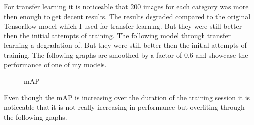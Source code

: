 \newpage \noindent
For transfer learning it is noticeable that 200 images for each category was more then enough to get decent results. The results degraded compared
to the original Tensorflow model which I used for transfer learning. But they were still better then the initial attempts of training. The following
model through transfer learning a degradation of. But they were still better then the initial attempts of training. The following
graphs are smoothed by a factor of 0.6 and showcase the performance of one of my models.
\vspace{0.25cm}
\begin{figure}[hbt!]
    \begin{center}
        \caption{mAP}
    \end{center}
\end{figure}
\newpage \noindent
Even though the mAP is increasing over the duration of the training session it is noticeable that it is not really increasing in performance but
overfiting through the following graphs.
\vspace{0.25cm}
